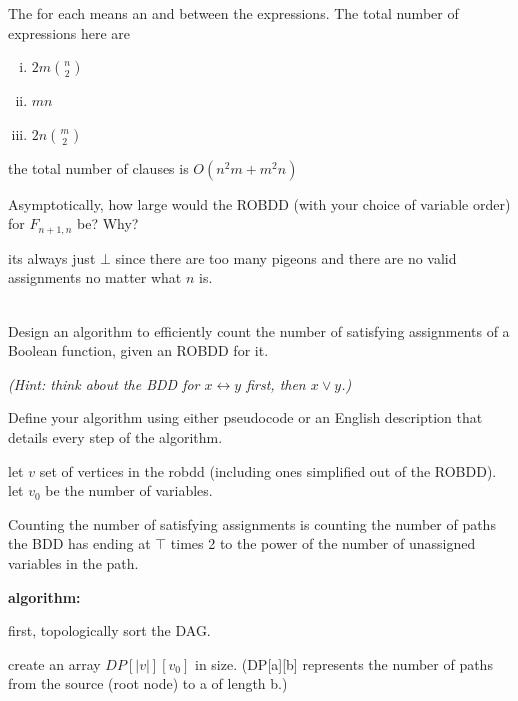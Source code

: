 \documentclass[11pt]{article}
\begin{document}
\begin{qunlist}
\begin{qparts}
\begin{answer}
      The for each means an and between the expressions. The total number of expressions here are

      \begin{enumerate}[i.]
        \item \(2m {n\choose 2}\)
        \item \(mn\)
        \item \(2n {m\choose 2}\)
      \end{enumerate}

      the total number of clauses is \(O(n^2m+m^2n)\)

    \end{answer}

  \item
    Asymptotically, how large would the ROBDD (with your choice of variable order) for $F_{n+1,n}$ be? Why?

    \begin{answer}
      its always just \(\bot\) since there are too many pigeons and there are no valid assignments no matter what \(n\) is.
    \end{answer}
  \end{qparts}

  \\
  Design an algorithm to efficiently count the number of satisfying assignments of a Boolean function, given an ROBDD for it.

  \emph{(Hint: think about the BDD for $x \leftrightarrow y$ first, then $x \lor y$.)}
  \begin{qparts}
  \item
    Define your algorithm using either pseudocode or an English description that details every step of the algorithm.

    \begin{answer}
      let \(v\) set of vertices in the robdd (including ones simplified out of the ROBDD). let \(v_0\) be the number of variables.

      Counting the number of satisfying assignments is counting the number of paths the BDD has ending at \(\top\) times 2 to the power of the number of unassigned variables in the path.

      \textbf{algorithm:}

      first, topologically sort the DAG.

      create an array \(DP[\lvert v\rvert ][v_0]\) in size. (DP[a][b] represents the number of paths from the source (root node) to a of length b.)


\end{answer}
\end{qparts}
\end{qunlist}
\end{document}
